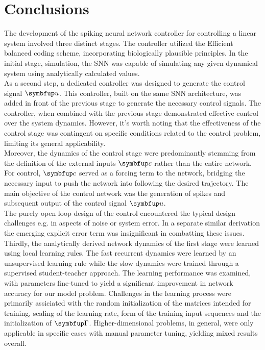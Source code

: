 \chapter{Conclusions}\label{c:conclusions}

The development of the spiking neural network controller for controlling a linear system involved three distinct stages. The controller utilized the Efficient balanced coding scheme, incorporating biologically plausible principles. In the initial stage, simulation, the \ac{SNN} was capable of simulating any given dynamical system using analytically calculated values.\\

As a second step, a dedicated controller was designed to generate the control signal $\bmu{u}$. This controller, built on the same \ac{SNN} architecture, was added in front of the previous stage to generate the necessary control signals. The controller, when combined with the previous stage demonstrated effective control over the system dynamics. However, it's worth noting that the effectiveness of the control stage was contingent on specific conditions related to the control problem, limiting its general applicability.\\
Moreover, the dynamics of the control stage were predominantly stemming from the definition of the external inputs $\bmu{c}$ rather than the entire network. For control, $\bmu{c}$ served as a forcing term to the network, bridging the necessary input to push the network into following the desired trajectory. The main objective of the control network was the generation of spikes and subsequent output of the control signal $\bmu{u}$.\\
The purely open loop design of the control encountered the typical design challenges e.g. in aspects of noise or system error. In a separate similar derivation the emerging explicit error term was insignificant in combatting these issues.\\

Thirdly, the analytically derived network dynamics of the first stage were learned using local learning rules. The fast recurrent dynamics were learned by an unsupervised learning rule while the slow dynamics were trained through a supervised student-teacher approach. The learning performance was examined, with parameters fine-tuned to yield a significant improvement in network accuracy for our model problem. Challenges in the learning process were primarily assiciated with the random initialization of the matrices intended for training, scaling of the learning rate, form of the training input sequences and the initialization of $\bmu{\Gamma}$. Higher-dimensional problems, in general, were only applicable in specific cases with manual parameter tuning, yielding mixed results overall.\\

